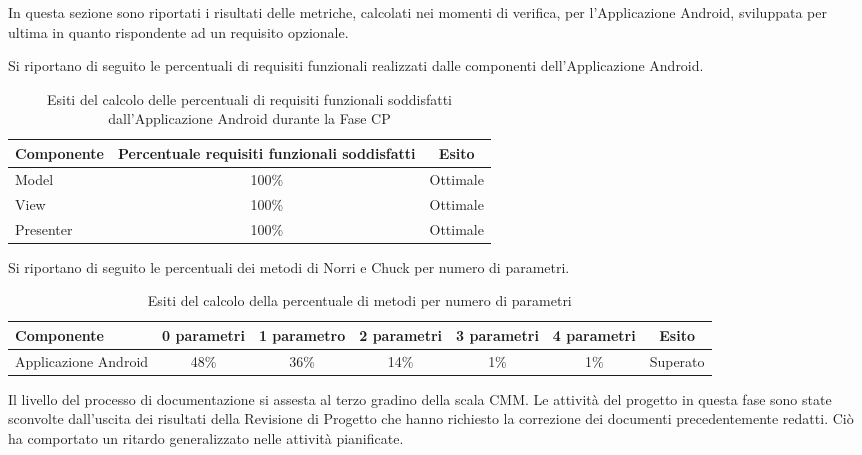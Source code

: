In questa sezione sono riportati i risultati delle metriche, calcolati nei momenti di verifica, per l'Applicazione Android, sviluppata per ultima in quanto rispondente ad un requisito opzionale.

Si riportano di seguito le percentuali di requisiti funzionali realizzati dalle componenti dell'Applicazione Android.
\begin{table}[H]
	\centering
		\begin{tabu}{| l | c | c |}
			\hline
			Componente	& Percentuale requisiti funzionali soddisfatti	& Esito		\\ \hline \hline
			Model	& 100\% 	& Ottimale  \\ \hline
			View  & 	100\%	& Ottimale  \\ \hline
			Presenter  & 	100\%	& Ottimale  \\ \hline
		\end{tabu}
	\caption{Esiti del calcolo delle percentuali di requisiti funzionali soddisfatti dall'Applicazione Android durante la Fase CP}
\end{table}

Si riportano di seguito le percentuali dei metodi di Norri e Chuck per numero di parametri.
\begin{table}[H]
	\centering
		\begin{tabu}{| l | c | c | c | c | c | c |}
			\hline
			Componente	& 0 parametri & 1 parametro & 2 parametri & 3 parametri & 4 parametri & Esito		\\ \hline \hline
			Applicazione Android	& 48\% & 36\% & 14\% & 1\% & 1\%	& Superato  \\ \hline
		\end{tabu}
	\caption{Esiti del calcolo della percentuale di metodi per numero di parametri}
\end{table}


 

Il livello del processo di documentazione si assesta al terzo gradino della scala CMM.
Le attività del progetto in questa fase sono state sconvolte dall'uscita dei risultati della Revisione di Progetto che hanno richiesto la correzione dei documenti precedentemente redatti. Ciò ha comportato un ritardo generalizzato nelle attività pianificate.


